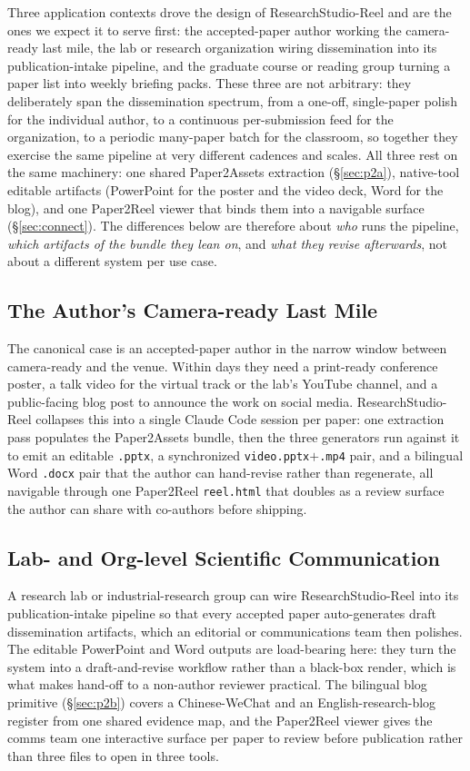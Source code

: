 \documentclass{article}
\begin{document}
Three application contexts drove the design of ResearchStudio-Reel and are the ones we expect it to serve first: the accepted-paper author working the camera-ready last mile, the lab or research organization wiring dissemination into its publication-intake pipeline, and the graduate course or reading group turning a paper list into weekly briefing packs. These three are not arbitrary: they deliberately span the dissemination spectrum, from a one-off, single-paper polish for the individual author, to a continuous per-submission feed for the organization, to a periodic many-paper batch for the classroom, so together they exercise the same pipeline at very different cadences and scales. All three rest on the same machinery: one shared Paper2Assets extraction (\S\ref{sec:p2a}), native-tool editable artifacts (PowerPoint for the poster and the video deck, Word for the blog), and one Paper2Reel viewer that binds them into a navigable surface (\S\ref{sec:connect}). The differences below are therefore about \emph{who} runs the pipeline, \emph{which artifacts of the bundle they lean on}, and \emph{what they revise afterwards}, not about a different system per use case.

\subsection{The Author's Camera-ready Last Mile}\label{sec:app-camera}
The canonical case is an accepted-paper author in the narrow window between camera-ready and the venue. Within days they need a print-ready conference poster, a talk video for the virtual track or the lab's YouTube channel, and a public-facing blog post to announce the work on social media. ResearchStudio-Reel collapses this into a single Claude Code session per paper: one extraction pass populates the Paper2Assets bundle, then the three generators run against it to emit an editable \texttt{.pptx}, a synchronized \texttt{video.pptx}$+$\texttt{.mp4} pair, and a bilingual Word \texttt{.docx} pair that the author can hand-revise rather than regenerate, all navigable through one Paper2Reel \texttt{reel.html} that doubles as a review surface the author can share with co-authors before shipping.

\subsection{Lab- and Org-level Scientific Communication}\label{sec:app-org}
A research lab or industrial-research group can wire ResearchStudio-Reel into its publication-intake pipeline so that every accepted paper auto-generates draft dissemination artifacts, which an editorial or communications team then polishes. The editable PowerPoint and Word outputs are load-bearing here: they turn the system into a draft-and-revise workflow rather than a black-box render, which is what makes hand-off to a non-author reviewer practical. The bilingual blog primitive (\S\ref{sec:p2b}) covers a Chinese-WeChat and an English-research-blog register from one shared evidence map, and the Paper2Reel viewer gives the comms team one interactive surface per paper to review before publication rather than three files to open in three tools.
\end{document}
